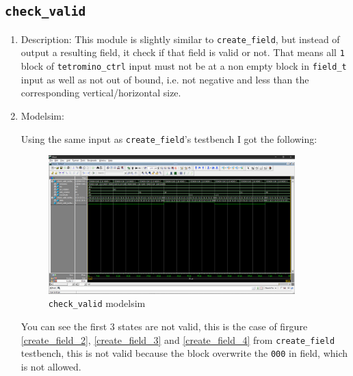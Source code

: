 \documentclass[scale = 0.9]{article}
\newcommand{\code}[1]{\colorbox{light-gray}{\texttt{#1}}} %
\begin{document}
\subsection{\code{check\_valid}}
\begin{enumerate}[label=(\alph*)]
  \item Description:
        This module is slightly similar to \code{create\_field}, but instead of output a resulting field,
        it check if that field is valid or not. That means all \code{1} block of \code{tetromino\_ctrl}
        input must not be at a non empty block in \code{field\_t} input as well as not out of bound, i.e.
        not negative and less than the corresponding vertical/horizontal size.
  \item Modelsim:

        Using  the same input as \code{create\_field}'s testbench I got the following:
        \begin{figure}[H]
          \begin{center}
            \includegraphics[width=0.9\textwidth]{check_valid.png}
            \caption{\code{check\_valid} modelsim}\label{check_valid}
          \end{center}
        \end{figure}

        You can see the first 3 states are not valid, this is the case of firgure \ref{create_field_2},
        \ref{create_field_3} and \ref{create_field_4} from \code{create\_field} testbench, this is not
        valid because the block overwrite the \code{000} in field, which is not allowed.

\end{enumerate}
\end{document}
